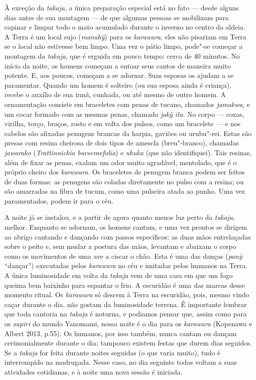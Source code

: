 À exceção da \emph{takaja}, a única preparação especial está no fato ---
desde alguns dias antes de sua montagem --- de que algumas pessoas se
mobilizam para capinar e limpar todo o mato acumulado durante o inverno
no centro da aldeia. A Terra é um local sujo (\emph{manahỹ}) para os
\emph{karawara}, eles não pisariam em Terra se o local não estivesse bem
limpo. Uma vez o pátio limpo, pode"-se começar a montagem da
\emph{takaja}, que é erguida em pouco tempo: cerca de 40 minutos. No
início da noite, os homens começam a entoar seus cantos de maneira muito
potente. E, aos poucos, começam a se adornar. Suas esposas os ajudam a
se paramentar. Quando um homem é solteiro (ou sua esposa ainda é
criança), recebe o auxílio de sua irmã, cunhada, ou até mesmo de outro
homem. A ornamentação consiste em braceletes com penas de tucano,
chamados \emph{jamakwa}, e um cocar formado com as mesmas penas, chamado
\emph{jakỹ ita}. No corpo --- coxas, virilha, torço, braços, rosto e em
volta dos pulsos, como um bracelete --- e nos cabelos são afixadas
penugens brancas da harpia, gaviões ou urubu"-rei. Estas são presas com
resina cheirosa de dois tipos de amescla (breu"-branco), chamadas
\emph{jawarako} (\emph{Trattinnickia burseraefolia}) e \emph{uhuka} (que
não identifiquei). Tais resinas, além de fixar as penas, exalam um odor
muito agradável, mentolado, que é o próprio cheiro dos \emph{karawara}.
Os braceletes de penugem branca podem ser feitos de duas formas: as
penugens são coladas diretamente no pulso com a resina; ou são amarradas
na fibra de tucum, como uma pulseira atada ao punho. Uma vez
paramentados, podem ir para o céu.

A noite já se instalou, e a partir de agora quanto menos luz perto da
\emph{takaja}, melhor. Enquanto se adornam, os homens cantam, e uma vez
prontos se dirigem ao abrigo cantando e dançando com passos específicos:
as duas mãos entrelaçadas sobre o peito e, sem mudar a postura das mãos,
levantam e abaixam o corpo como os movimentos de uma ave a ciscar o
chão. Esta é uma das danças (\emph{panỹ} ``dançar'') executadas pelos
\emph{karawara} no céu e imitadas pelos humanos na Terra. A única
luminosidade em volta da \emph{takaja} vem de uma casa em que um fogo
queima bem baixinho para espantar o frio. A escuridão é uma das marcas
desse momento ritual. Os \emph{karawara} só descem à Terra na escuridão,
pois, mesmo vindo caçar durante o dia, não gostam da luminosidade
terrena. É importante lembrar que toda cantoria na \emph{takaja} é
noturna, e podiamos pensar que, assim como para os \emph{xapiri} do
mundo Yanomami, nossa noite é o dia para os \emph{karawara} (Kopenawa e
Albert 2013, p.55). Os humanos, por isso também, nunca cantam ou dançam
cerimonialmente durante o dia; tampouco existem festas que durem dias
seguidos. Se a \emph{takaja} for feita durante noites seguidas (o que
varia muito), tudo é interrompido na madrugada. Nesse caso, no dia
seguinte todos voltam a suas atividades cotidianas, e à noite uma nova
sessão é iniciada.

